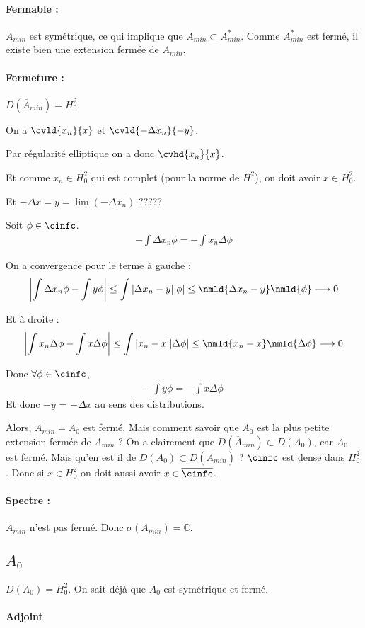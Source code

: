 \paragraph{Fermable :} $A_{min}$ est symétrique, ce qui implique que
$A_{min} \subset A_{min}^*$. Comme $A_{min}^*$ est fermé, il existe bien
une extension fermée de $A_{min}$.



\paragraph{Fermeture :} $D(\overline A_{min}) = H_0^2$.

On a $\cvld{x_n}{x}$ et $\cvld{-\Delta x_n}{-y}$.

Par régularité elliptique on a donc $\cvhd{x_n}{x}$.

Et comme $x_n \in H_0^2$ qui est complet (pour la norme de $H^2$),
on doit avoir $x \in H_0^2$.

Et $-\Delta x = y = \lim(-\Delta x_n)$ ?????

Soit $\phi \in \cinfc$.
\begin{align}
    -\int \Delta x_n \phi = -\int x_n \Delta \phi
\end{align}

On a convergence pour le terme à gauche :
\begin{align}
    \left| \int \Delta x_n \phi - \int y \phi \right|
    \leq \int | \Delta x_n - y | |\phi|
    \leq \nmld{\Delta x_n - y} \nmld{\phi} \longrightarrow 0
\end{align}

Et à droite :
\begin{align}
    \left| \int x_n \Delta \phi - \int x \Delta \phi \right|
    \leq \int | x_n - x | | \Delta \phi|
    \leq \nmld{x_n - x} \nmld{\Delta \phi} \longrightarrow 0
\end{align}

Donc $\forall \phi \in \cinfc$,
\begin{align}
    -\int y \phi = -\int x \Delta \phi
\end{align}
Et donc $-y$ = $-\Delta x$ au sens des distributions.

Alors, $\overline A_{min} = A_0$ est fermé. Mais comment
savoir que $A_0$ est la plus petite extension fermée de $A_{min}$ ?
On a clairement que $D(\overline A_{min}) \subset D(A_0)$, car $A_0$
est fermé. Mais qu'en est il de $D(A_0) \subset D(\overline A_{min})$ ?
$\cinfc$ est dense dans $H_0^2$. Donc si $x \in H_0^2$ on doit aussi
avoir $x \in \overline \cinfc$.

\paragraph{Spectre :} $A_{min}$ n'est pas fermé.
Donc $\sigma(A_{min}) = \mathbb{C}$.

\newpage
\subsection{$A_0$}

$D(A_0) = H_0^2$. On sait déjà que $A_0$ est symétrique et fermé.

\paragraph{Adjoint}

